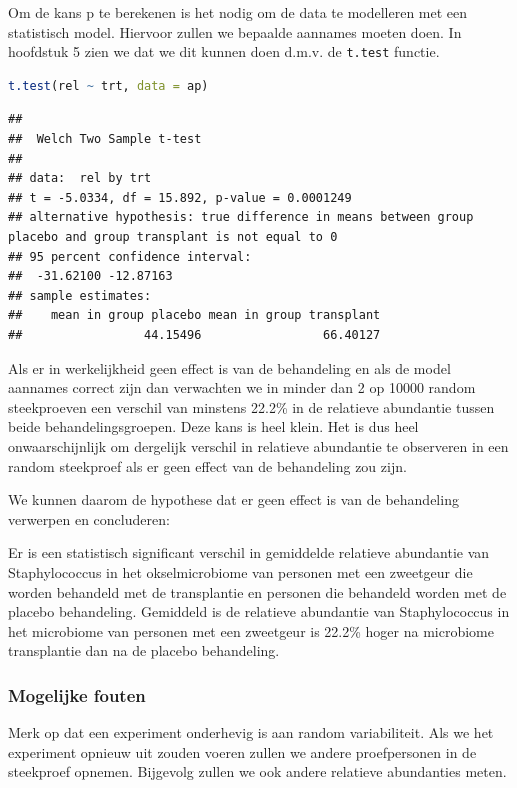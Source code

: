 \documentclass[
  12pt,dutch,coursenotes]{book}
\newcommand{\passthrough}[1]{#1}
\theoremstyle{definition}
\theoremstyle{definition}
\theoremstyle{definition}
\theoremstyle{definition}
\theoremstyle{remark}
\begin{document}
Om de kans p te berekenen is het nodig om de data te modelleren met een statistisch model. Hiervoor zullen we bepaalde aannames moeten doen. In hoofdstuk 5 zien we dat we dit kunnen doen d.m.v. de \passthrough{\lstinline!t.test!} functie.

\begin{lstlisting}[language=R]
t.test(rel ~ trt, data = ap)
\end{lstlisting}

\begin{lstlisting}
## 
##  Welch Two Sample t-test
## 
## data:  rel by trt
## t = -5.0334, df = 15.892, p-value = 0.0001249
## alternative hypothesis: true difference in means between group placebo and group transplant is not equal to 0
## 95 percent confidence interval:
##  -31.62100 -12.87163
## sample estimates:
##    mean in group placebo mean in group transplant 
##                 44.15496                 66.40127
\end{lstlisting}

Als er in werkelijkheid geen effect is van de behandeling en als de model aannames correct zijn dan verwachten we in minder dan 2 op 10000 random steekproeven een verschil van minstens 22.2\% in de relatieve abundantie tussen beide behandelingsgroepen.
Deze kans is heel klein. Het is dus heel onwaarschijnlijk om dergelijk verschil in relatieve abundantie te observeren in een random steekproef als er geen effect van de behandeling zou zijn.

We kunnen daarom de hypothese dat er geen effect is van de behandeling verwerpen en concluderen:

Er is een statistisch significant verschil in gemiddelde relatieve abundantie van Staphylococcus in het okselmicrobiome van personen met een zweetgeur die worden behandeld met de transplantie en personen die behandeld worden met de placebo behandeling.
Gemiddeld is de relatieve abundantie van Staphylococcus in het microbiome van personen met een zweetgeur is 22.2\% hoger na microbiome transplantie dan na de placebo behandeling.

\hypertarget{mogelijke-fouten}{%
\subsubsection{Mogelijke fouten}\label{mogelijke-fouten}}

Merk op dat een experiment onderhevig is aan random variabiliteit. Als we het experiment opnieuw uit zouden voeren zullen we andere proefpersonen in de steekproef opnemen. Bijgevolg zullen we ook andere relatieve abundanties meten.
\end{document}
